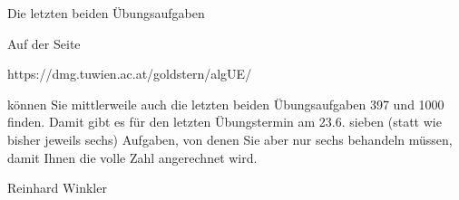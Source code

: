 Die letzten beiden Übungsaufgaben

Auf der Seite

https://dmg.tuwien.ac.at/goldstern/algUE/

können Sie mittlerweile auch die letzten beiden Übungsaufgaben 397 und 1000 finden. Damit gibt es für den letzten Übungstermin am 23.6. sieben (statt wie bisher jeweils sechs) Aufgaben, von denen Sie aber nur sechs behandeln müssen, damit Ihnen die volle Zahl angerechnet wird.

Reinhard Winkler 
